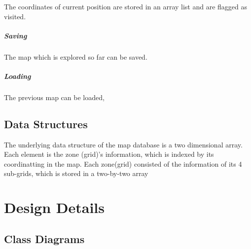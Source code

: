 \documentclass[11pt, a4paper]{report}
\begin{document}
The coordinates of current position are stored in an array list and are flagged as visited.

\paragraph{Saving}

The map which is explored so far can be saved.

\paragraph{Loading}

The previous map can be loaded,



\section{Data Structures}
The underlying data structure of the map database is a two dimensional array. Each element
is the zone (grid)'s information, which is indexed by its coordinatting in the map. Each zone(grid)
consisted of the information of its 4 sub-grids, which is stored in a two-by-two array


\pagebreak

\chapter{Design Details}%
\label{cha:DD2}


\section{Class Diagrams}
\end{document}

